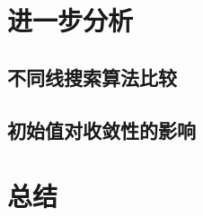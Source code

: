 \documentclass{article}
\begin{document}
\section{进一步分析}
\subsection{不同线搜索算法比较}

\subsection{初始值对收敛性的影响}

\section{总结}



\end{document}
